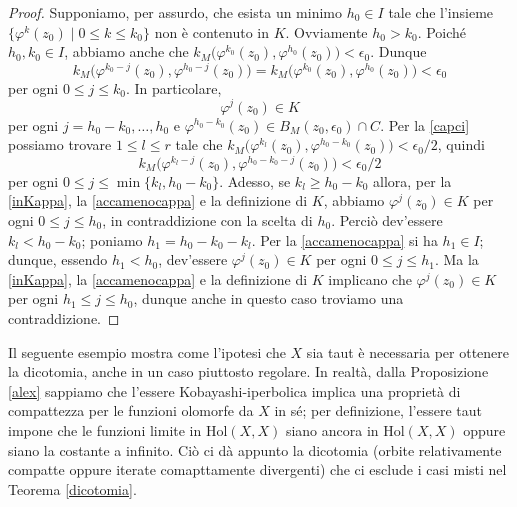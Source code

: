 \begin{proof}
    Supponiamo, per assurdo, che esista un minimo $h_0 \in I$ tale che l'insieme $\{\varphi^k(z_0)\mid 0\le k\le k_0\}$ non è contenuto in $K$. Ovviamente $h_0>k_0$. Poiché $h_0,k_0 \in I$, abbiamo anche che $k_M\big(\varphi^{k_0}(z_0),\varphi^{h_0}(z_0)\big)<\epsilon_0$. Dunque
    $$k_M\big(\varphi^{k_0-j}(z_0),\varphi^{h_0-j}(z_0)\big)=k_M\big(\varphi^{k_0}(z_0),\varphi^{h_0}(z_0)\big)<\epsilon_0$$
    per ogni $0 \le j \le k_0$. In particolare,
    \begin{equation} \label{inKappa}
        \varphi^j(z_0) \in K
    \end{equation}
    per ogni $j=h_0-k_0,\dots,h_0$ e $\varphi^{h_0-k_0}(z_0)\in B_M(z_0,\epsilon_0)\cap C$. Per la \eqref{capci} possiamo trovare $1 \le l \le r$ tale che $k_M\big(\varphi^{k_l}(z_0),\varphi^{h_0-k_0}(z_0)\big)<\epsilon_0/2$, quindi
    \begin{equation} \label{accamenocappa}
        k_M\big(\varphi^{k_l-j}(z_0),\varphi^{h_0-k_0-j}(z_0)\big)<\epsilon_0/2
    \end{equation}
    per ogni $0 \le j \le \min\{k_l,h_0-k_0\}$. Adesso, se $k_l \ge h_0-k_0$ allora, per la \eqref{inKappa}, la \eqref{accamenocappa} e la definizione di $K$, abbiamo $\varphi^j(z_0) \in K$ per ogni $0 \le j \le h_0$, in contraddizione con la scelta di $h_0$. Perciò dev'essere $k_l<h_0-k_0$; poniamo $h_1=h_0-k_0-k_l$. Per la \eqref{accamenocappa} si ha $h_1 \in I$; dunque, essendo $h_1<h_0$, dev'essere $\varphi^j(z_0) \in K$ per ogni $0 \le j \le h_1$. Ma la \eqref{inKappa}, la \eqref{accamenocappa} e la definizione di $K$ implicano che $\varphi^j(z_0) \in K$ per ogni $h_1 \le j \le h_0$, dunque anche in questo caso troviamo una contraddizione.
\end{proof}

Il seguente esempio mostra come l'ipotesi che $X$ sia taut è necessaria per ottenere la dicotomia, anche in un caso piuttosto regolare. In realtà, dalla Proposizione \ref{alex} sappiamo che l'essere Kobayashi-iperbolica implica una proprietà di compattezza per le funzioni olomorfe da $X$ in sé; per definizione, l'essere taut impone che le funzioni limite in $\text{Hol}(X,X)$ siano ancora in $\text{Hol}(X,X)$ oppure siano la costante a infinito. Ciò ci dà appunto la dicotomia (orbite relativamente compatte oppure iterate comapttamente divergenti) che ci esclude i casi misti nel Teorema \ref{dicotomia}.


